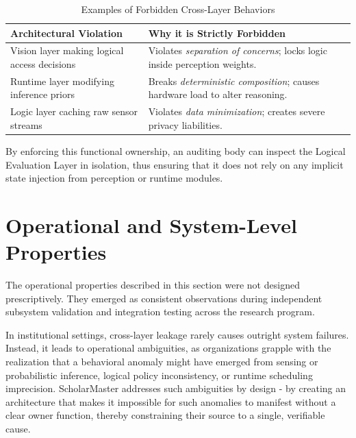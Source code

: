 \documentclass[conference]{IEEEtran}
\begin{document}
\begin{table}[htbp]
\caption{Examples of Forbidden Cross-Layer Behaviors}
\label{tab:forbidden}
\centering
\begin{tabular}{@{}p{3.6cm} p{4.4cm}@{}}
\toprule
\textbf{Architectural Violation} & \textbf{Why it is Strictly Forbidden} \\
\midrule
Vision layer making logical access decisions & Violates \textit{separation of concerns}; locks logic inside perception weights. \\
\addlinespace
Runtime layer modifying inference priors & Breaks \textit{deterministic composition}; causes hardware load to alter reasoning. \\
\addlinespace
Logic layer caching raw sensor streams & Violates \textit{data minimization}; creates severe privacy liabilities. \\
\bottomrule
\end{tabular}
\end{table}

By enforcing this functional ownership, an auditing body can inspect the Logical Evaluation Layer in isolation, thus ensuring that it does not rely on any implicit state injection from perception or runtime modules.

\section{Operational and System-Level Properties}

The operational properties described in this section were not designed prescriptively. They emerged as consistent observations during independent subsystem validation and integration testing across the research program.

In institutional settings, cross-layer leakage rarely causes outright system failures. Instead, it leads to operational ambiguities, as organizations grapple with the realization that a behavioral anomaly might have emerged from sensing or probabilistic inference, logical policy inconsistency, or runtime scheduling imprecision. ScholarMaster addresses such ambiguities by design - by creating an architecture that makes it impossible for such anomalies to manifest without a clear owner function, thereby constraining their source to a single, verifiable cause.
\end{document}
